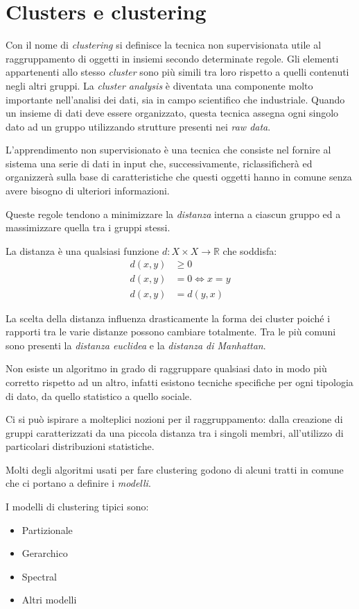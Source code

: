 \chapter{Clusters e clustering}
	Con il nome di \emph{clustering} si definisce la tecnica non supervisionata utile al raggruppamento di oggetti in insiemi secondo determinate regole. Gli elementi appartenenti allo stesso \emph{cluster} sono più simili tra loro rispetto a quelli contenuti negli altri gruppi. La \emph{cluster analysis} è diventata una componente molto importante nell'analisi dei dati, sia in campo scientifico che industriale. Quando un insieme di dati deve essere organizzato, questa tecnica assegna ogni singolo dato ad un gruppo utilizzando strutture presenti nei \emph{raw data}.

	L'apprendimento non supervisionato è una tecnica che consiste nel fornire al sistema una serie di dati in input che, successivamente, riclassificherà ed organizzerà sulla base di caratteristiche che questi oggetti hanno in comune senza avere bisogno di ulteriori informazioni.

	Queste regole tendono a minimizzare la \emph{distanza} interna a ciascun gruppo ed a massimizzare quella tra i gruppi stessi.

	La distanza è una qualsiasi funzione $d:X \times X \to \mathbb{R}$ che soddisfa:
	\begin{align*}
		d(x,y) &\geq 0 \\
		d(x,y) &= 0 \iff x=y \\
		d(x,y) &= d(y,x)
	\end{align*}

	La scelta della distanza influenza drasticamente la forma dei cluster poiché i rapporti tra le varie distanze possono cambiare totalmente. Tra le più comuni sono presenti la \emph{distanza euclidea} e la \emph{distanza di Manhattan}.

	Non esiste un algoritmo in grado di raggruppare qualsiasi dato in modo più corretto rispetto ad un altro, infatti esistono tecniche specifiche per ogni tipologia di dato, da quello statistico a quello sociale.

	Ci si può ispirare a molteplici nozioni per il raggruppamento: dalla creazione di gruppi caratterizzati da una piccola distanza tra i singoli membri, all’utilizzo di particolari distribuzioni statistiche.

	Molti degli algoritmi usati per fare clustering godono di alcuni tratti in comune che ci portano a definire i \emph{modelli}.

	I modelli di clustering tipici sono:
	\begin{itemize}
		\item Partizionale
		\item Gerarchico
		\item Spectral
		\item Altri modelli
	\end{itemize}

	
	
	
	
%	
%	
